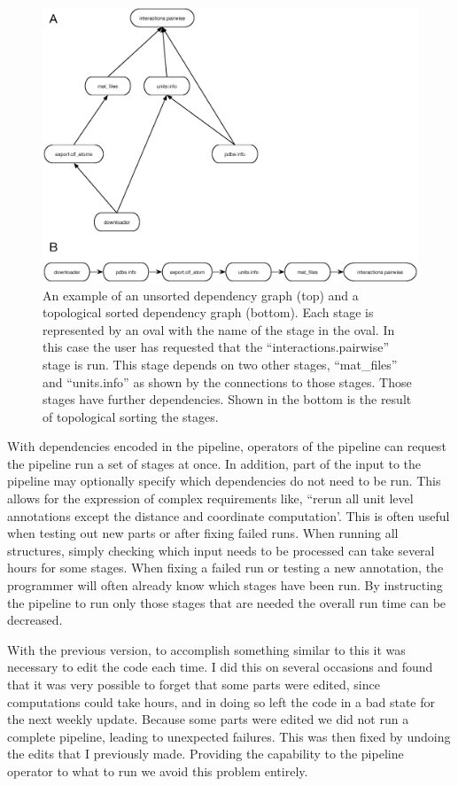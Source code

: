 \begin{figure}
  \includegraphics[width=\linewidth]{chapter-2/figs/deps}
  \caption{An example of an unsorted dependency graph (top) and a topological
    sorted dependency graph (bottom). Each stage is represented by an oval with
    the name of the stage in the oval. In this case the user has requested that
    the ``interactions.pairwise'' stage is run. This stage depends on two other
    stages, ``mat\_files'' and ``units.info'' as shown by the connections to those
    stages. Those stages have further dependencies. Shown in the bottom is the
    result of topological sorting the stages.}
\label{fig:stage-deps}
\end{figure}

With dependencies encoded in the pipeline, operators of the pipeline can request
the pipeline run a set of stages at once. In addition, part of the input to the
pipeline may optionally specify which dependencies do not need to be run. This
allows for the expression of complex requirements like, ``rerun all unit level
annotations except the distance and coordinate computation'. This is often
useful when testing out new parts or after fixing failed runs. When running all
structures, simply checking which input needs to be processed can take several
hours for some stages. When fixing a failed run or testing a new annotation, the
programmer will often already know which stages have been run. By instructing
the pipeline to run only those stages that are needed the overall run time can
be decreased.

With the previous version, to accomplish something similar to this it was
necessary to edit the code each time. I did this on several occasions and found
that it was very possible to forget that some parts were edited, since
computations could take hours, and in doing so left the code in a bad state for
the next weekly update. Because some parts were edited we did not run a complete
pipeline, leading to unexpected failures. This was then fixed by undoing the
edits that I previously made. Providing the capability to the pipeline operator
to what to run we avoid this problem entirely.

